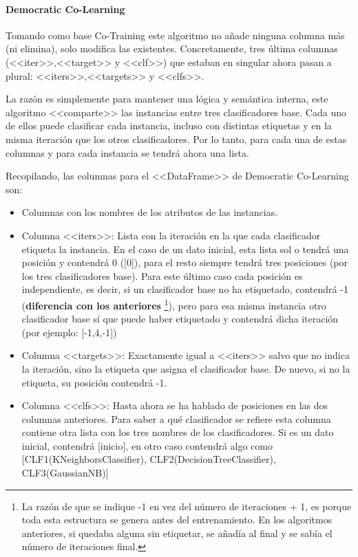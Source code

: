 \paragraph{Democratic Co-Learning}
Tomando como base Co-Training este algoritmo no añade ninguna columna más (ni
elimina), solo modifica las existentes. Concretamente, tres última columnas
(<<iter>>,<<target>> y <<clf>>) que estaban en singular ahora pasan a plural:
<<iters>>,<<targets>> y <<clfs>>. 

La razón es simplemente para mantener una lógica y semántica interna, este
algoritmo <<comparte>> las instancias entre tres clasificadores base. Cada uno
de ellos puede clasificar cada instancia, incluso con distintas etiquetas y en
la misma iteración que los otros clasificadores. Por lo tanto, para cada una de
estas columnas y para cada instancia se tendrá ahora una lista.

Recopilando, las columnas para el <<DataFrame>> de Democratic Co-Learning son:

\begin{itemize}
    \item Columnas con los nombres de los atributos de las instancias.
    \item Columna <<iters>>: Lista con la iteración en la que cada clasificador
    etiqueta la instancia. En el caso de un dato inicial, esta lista sol o
    tendrá una posición y contendrá 0 ([0]), para el resto siempre tendrá
    tres posiciones (por los tres clasificadores base). Para este último caso
    cada posición es independiente, es decir, si un clasificador base no ha
    etiquetado, contendrá -1 (\textbf{diferencia con los anteriores}
    \footnote{La razón de que se indique -1 en vez del número de iteraciones +
    1, es porque toda esta estructura se genera antes del entrenamiento. En los
    algoritmos anteriores, si quedaba alguna sin etiquetar, se añadía al final y
    se sabía el número de iteraciones final.}), pero para esa misma instancia otro
    clasificador base sí que puede haber etiquetado y contendrá dicha iteración
    (por ejemplo: [-1,4,-1])
    \item Columna <<targets>>: Exactamente igual a <<iters>> salvo que no indica
    la iteración, sino la etiqueta que asigna el clasificador base. De nuevo, si
    no la etiqueta, su posición contendrá -1.
    \item Columna <<clfs>>: Hasta ahora se ha hablado de posiciones en las dos
    columnas anteriores. Para saber a qué clasificador se refiere esta columna
    contiene otra lista con los tres nombres de los clasificadores. Si es un
    dato inicial, contendrá [inicio], en otro caso contendrá algo como
    [CLF1(KNeighborsClassifier), CLF2(DecisionTreeClassifier),
    CLF3(GaussianNB)]
\end{itemize}


